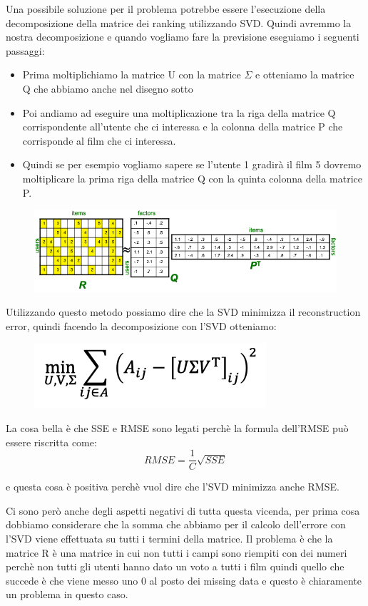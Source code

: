 \documentclass[14pt]{extreport}
\begin{document}
Una possibile soluzione per il problema potrebbe essere l'esecuzione della decomposizione della matrice dei ranking utilizzando SVD.
Quindi avremmo la nostra decomposizione e quando vogliamo fare la previsione eseguiamo i seguenti passaggi:
\begin{itemize}
	\item Prima moltiplichiamo la matrice U con la matrice $\Sigma$ e otteniamo la matrice Q che abbiamo anche nel disegno sotto 
	\item Poi andiamo ad eseguire una moltiplicazione tra la riga della matrice Q corrispondente all'utente che ci interessa e la colonna della matrice P
	che corrisponde al film che ci interessa.
	\item Quindi se per esempio vogliamo sapere se l'utente 1 gradirà il film 5 dovremo moltiplicare la prima riga della matrice Q con la quinta colonna della
	matrice P.
\end{itemize}

\begin{figure}[H] 
\centering
\includegraphics[width=0.7\linewidth]{513.jpeg}
\end{figure}


Utilizzando questo metodo possiamo dire che la SVD minimizza il reconstruction error, quindi facendo la decomposizione con l'SVD otteniamo:

\begin{figure}[H] 
\centering
\includegraphics[width=0.7\linewidth]{514.jpeg}
\end{figure}

La cosa bella è che SSE e RMSE sono legati perchè la formula dell'RMSE può essere riscritta come:
$$RMSE = \frac{1}{C}\sqrt{SSE}$$

e questa cosa è positiva perchè vuol dire che l'SVD minimizza anche RMSE.

Ci sono però anche degli aspetti negativi di tutta questa vicenda, per prima cosa dobbiamo considerare che la somma che abbiamo per il calcolo dell'errore
con l'SVD viene effettuata su tutti i termini della matrice. Il problema è che la matrice R è una matrice in cui non tutti i campi sono riempiti con dei numeri
perchè non tutti gli utenti hanno dato un voto a tutti i film quindi quello che succede è che viene messo uno 0 al posto dei missing data e questo è 
chiaramente un problema in questo caso.
\end{document}
